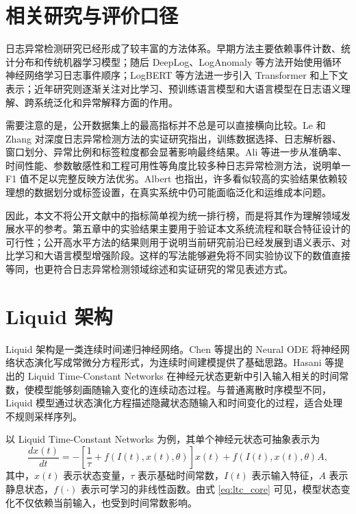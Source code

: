 \section{相关研究与评价口径}

日志异常检测研究已经形成了较丰富的方法体系。早期方法主要依赖事件计数、统计分布和传统机器学习模型；随后 DeepLog、LogAnomaly 等方法开始使用循环神经网络学习日志事件顺序；LogBERT 等方法进一步引入 Transformer 和上下文表示；近年研究则逐渐关注对比学习、预训练语言模型和大语言模型在日志语义理解、跨系统泛化和异常解释方面的作用\cite{he2021survey,landauer2023survey,cabello2025aiops}。

需要注意的是，公开数据集上的最高指标并不总是可以直接横向比较。Le 和 Zhang 对深度日志异常检测方法的实证研究指出，训练数据选择、日志解析器、窗口划分、异常比例和标签粒度都会显著影响最终结果\cite{le2022howfar}。Ali 等进一步从准确率、时间性能、参数敏感性和工程可用性等角度比较多种日志异常检测方法，说明单一 F1 值不足以完整反映方法优劣\cite{ali2025comprehensive}。Albert 也指出，许多看似较高的实验结果依赖较理想的数据划分或标签设置，在真实系统中仍可能面临泛化和运维成本问题\cite{albert2025rightpath}。

因此，本文不将公开文献中的指标简单视为统一排行榜，而是将其作为理解领域发展水平的参考。第五章中的实验结果主要用于验证本文系统流程和联合特征设计的可行性；公开高水平方法的结果则用于说明当前研究前沿已经发展到语义表示、对比学习和大语言模型增强阶段。这样的写法能够避免将不同实验协议下的数值直接等同，也更符合日志异常检测领域综述和实证研究的常见表述方式。

\section{Liquid 架构}

Liquid 架构是一类连续时间递归神经网络。Chen 等提出的 Neural ODE 将神经网络状态演化写成常微分方程形式，为连续时间建模提供了基础思路\cite{chen2018neuralode}。Hasani 等提出的 Liquid Time-Constant Networks 在神经元状态更新中引入输入相关的时间常数，使模型能够刻画随输入变化的连续动态过程\cite{hasani2021liquid}。与普通离散时序模型不同，Liquid 模型通过状态演化方程描述隐藏状态随输入和时间变化的过程，适合处理不规则采样序列。

以 Liquid Time-Constant Networks 为例，其单个神经元状态可抽象表示为
\begin{equation}
    \frac{dx(t)}{dt}=-\left[\frac{1}{\tau}+f(I(t),x(t),\theta)\right]x(t)+f(I(t),x(t),\theta)A,
    \label{eq:ltc_core}
\end{equation}
其中，$x(t)$ 表示状态变量，$\tau$ 表示基础时间常数，$I(t)$ 表示输入特征，$A$ 表示静息状态，$f(\cdot)$ 表示可学习的非线性函数。由式 \ref{eq:ltc_core} 可见，模型状态变化不仅依赖当前输入，也受到时间常数影响。

